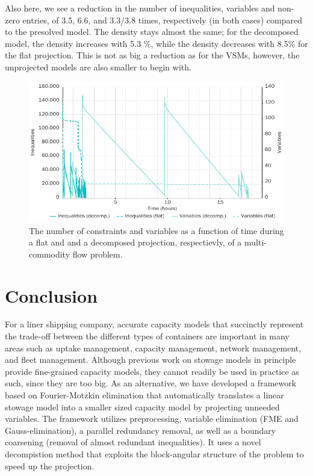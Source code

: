 Also here, we see a reduction in the number of inequalities, variables and non-zero entries, of 3.5, 6.6, and 3.3/3.8 times, respectively (in both cases) compared to the presolved model. The density stays almost the same; for the decomposed model, the density increases with 5.3 \%, while the density decreases with 8.5\% for the flat projection.
This is not as big a reduction as for the VSMs, however, the unprojected models are also smaller to begin with. 

\begin{figure}
	\centering
		\includegraphics{figures/multicomGraph.pdf}
	\caption{The number of constraints and variables as a function of time during a flat and and a decomposed projection, respectievly, of a multi-commodity flow problem.}
	\label{fig:multicom}
\end{figure}

\section{Conclusion}\label{sec:concl}
For a liner shipping company, accurate capacity models that succinctly represent the trade-off between the different types of containers are important in many areas such as uptake management, capacity management, network management, and fleet management. Although previous work on stowage models in principle provide fine-grained capacity models, they cannot readily be used in practice as such, since they are too big.
As an alternative, we have developed a framework based on Fourier-Motzkin elimination that automatically translates a linear stowage model into a smaller sized capacity model by projecting unneeded variables. The framework utilizes preprocessing, variable elimination (FME and Gauss-elimination), a parallel redundancy removal, as well as a boundary coarsening (removal of almost redundant inequalities). It uses a novel decompistion method that exploits the block-angular structure of the problem to speed up the projection.

